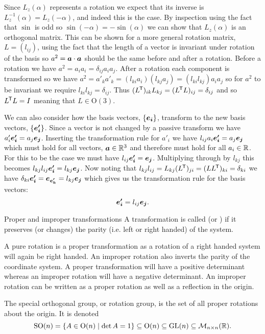 \documentclass[a4paper]{article}
\newcommand{\nxmMatrices}[3]{\mathcal{M}_{{#1}\times{#2}}({#3})}
\newcommand{\generalLinearGroup}{\mathrm{GL}}
\newcommand{\orthogonalGroup}{\mathrm{O}}
\newcommand{\specialOrthogonalGroup}{\mathrm{SO}}
\begin{document}
    Since \(L_z(\alpha)\) represents a rotation we expect that its inverse is \(L_z^{-1}(\alpha) = L_z(-\alpha)\), and indeed this is the case.
    By inspection using the fact that \(\sin\) is odd so \(\sin(-\alpha) = -\sin(\alpha)\) we can show that \(L_z(\alpha)\) is an orthogonal matrix.
    This can be shown for a more general rotation matrix, \(L = (l_{ij})\), using the fact that the length of a vector is invariant under rotation of the basis so \(a^2 = \bm{a}\cdot\bm{a}\) should be the same before and after a rotation.
    Before a rotation we have \(a^2 = a_ia_i = \delta_{ij} a_ia_j\).
    After a rotation each component is transformed so we have \(a^2 = a'_ka'_k = (l_{ki}a_i)(l_{kj}a_j) = (l_{ki}l_{kj})a_ia_j\) so for \(a^2\) to be invariant we require \(l_{ki}l_{kj} = \delta_{ij}\).
    Thus \((L^{\mkern-1.5mu\mathsf{T}})_{ik}L_{kj} = (L^{\mkern-1.5mu\mathsf{T}} L)_{ij} = \delta_{ij}\) and so \(L^{\mkern-1.5mu\mathsf{T}} L = I\) meaning that \(L\in\orthogonalGroup(3)\).
    
    We can also consider how the basis vectors, \(\{\bm{e_{i}}\}\), transform to the new basis vectors, \(\{\bm{e'_i}\}\).
    Since a vector is not changed by a passive transform we have \(a'_i\bm{e'_i} = a_j\bm{e_{j}}\).
    Inserting the transformation rule for \(a'_{i}\) we have \(l_{ij}a_i\bm{e'_i} = a_j\bm{e_{j}}\) which must hold for all vectors, \(\bm{a}\in\mathbb{R}^3\) and therefore must hold for all \(a_i\in\mathbb{R}\).
    For this to be the case we must have \(l_{ij}\bm{e'_i} = \bm{e_{j}}\).
    Multiplying through by \(l_{kj}\) this becomes \(l_{kj}l_{ij}\bm{e'_i} = l_{kj}\bm{e_{j}}\).
    Now noting that \(l_{kj}l_{ij} = L_{kj}(L^{\mkern-1.5mu\mathsf{T}})_{ji} = (LL^{\mkern-1.5mu\mathsf{T}})_{ki} = \delta_{ki}\) we have \(\delta_{ki}\bm{e'_i} = \bm{e_{e'_k}} = l_{kj}\bm{e_{j}}\) which gives us the transformation rule for the basis vectors:
    \[\bm{e'_i} = l_{ij}\bm{e_{j}}.\]
    
    \begin{definition}{Proper and improper transformations}{}
        A transformation is called  (or ) if it preserves (or changes) the parity (i.e. left or right handed) of the system.
    \end{definition}
    A pure rotation is a proper transformation as a rotation of a right handed system will again be right handed.
    An improper rotation also inverts the parity of the coordinate system.
    A proper transformation will have a positive determinant whereas an improper rotation will have a negative determinant.
    An improper rotation can be written as a proper rotation as well as a reflection in the origin.
    \begin{notation*}{}
        The special orthogonal group, or rotation group, is the set of all proper rotations about the origin.
        It is denoted
        \[\specialOrthogonalGroup(n) = \{A\in\orthogonalGroup(n)\mid \det A = 1\} \subseteq \orthogonalGroup(n) \subseteq \generalLinearGroup(n) \subseteq \nxmMatrices{n}{n}{\reals}.\]
    \end{notation*}
\end{document}
